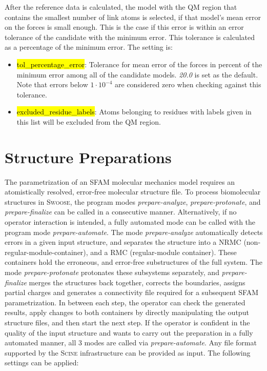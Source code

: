 \documentclass[]{tufte-book}
\begin{document}
{{After the reference data is calculated, the model with the QM region that contains the smallest number of link atoms is selected, if that model's mean error on the forces is small enough. This is the case if this error is within an error tolerance of the candidate with the minimum error. This tolerance is calculated as a percentage of the minimum error. The setting is:

\begin{itemize}
\item \hl{tol\_percentage\_error}: Tolerance for mean error of the forces in percent of the minimum error among all of the candidate models. \textit{20.0} is set as the default. Note that errors below $1\cdot 10^{-4}$ are considered zero when checking against this tolerance.
\end{itemize}

\begin{itemize}
    \item \hl{excluded\_residue\_labels}: Atoms belonging to residues with labels given in this list will be excluded from the QM region.
\end{itemize}

\chapter{Structure Preparations}\label{ch:struct_prep}

The parametrization of an SFAM molecular mechanics model requires an atomistically resolved, error-free molecular structure file. 
To process biomolecular structures in \textsc{Swoose}, the program modes \textit{prepare-analyze}, \textit{prepare-protonate}, and \textit{prepare-finalize} can  be called in a consecutive manner. Alternatively, if no operator interaction is intended, a fully automated mode can be called  with the program mode \textit{prepare-automate}. 
The mode \textit{prepare-analyze} automatically detects errors in a given input structure, and separates the structure into a NRMC (non-regular-module-container), and a RMC (regular-module container). These containers hold the erroneous, and error-free substructures of the full system.  
The mode \textit{prepare-protonate} protonates these subsystems separately, and \textit{prepare-finalize} merges the structures back together, corrects the boundaries, assigns partial charges and generates a connectivity file required for a subsequent SFAM parametrization. In between each step, the operator can check the generated results, apply changes to both containers by directly manipulating the output structure files, and then start the next step. If the operator is confident in the quality of the input structure and wants to carry out the preparation in a fully automated manner, all 3 modes are called via \textit{prepare-automate}. Any file format supported by the \textsc{Scine} infrastructure can be provided as input. The following settings can be applied:

}}
\end{document}

